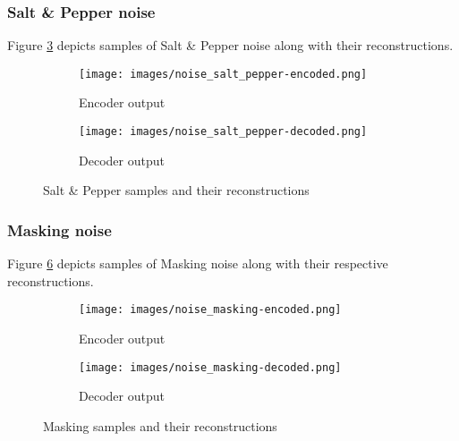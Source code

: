 \documentclass[10pt, a4paper]{article}
\begin{document}
    \subsubsection{Salt \& Pepper noise}
    Figure \ref{fig:figsp} depicts samples of Salt \& Pepper noise along with their reconstructions.
    
    \begin{figure}[h]
    \begin{subfigure}{0.2\textwidth}
    \texttt{[image: images/noise\_salt\_pepper-encoded.png]} 
    \caption{Encoder output}
    \label{fig:subim1}
    \end{subfigure}
    \begin{subfigure}{0.2\textwidth}
    \texttt{[image: images/noise\_salt\_pepper-decoded.png]}
    \caption{Decoder output}
    \label{fig:subim2}
    \end{subfigure}
    \caption{Salt \& Pepper samples and their reconstructions}
    \label{fig:figsp}
    \end{figure}
    
    \subsubsection{Masking noise}
    Figure \ref{fig:figma} depicts samples of Masking noise along with their respective reconstructions.
    
    \begin{figure}[h]
    \begin{subfigure}{0.2\textwidth}
    \texttt{[image: images/noise\_masking-encoded.png]} 
    \caption{Encoder output}
    \label{fig:subim1}
    \end{subfigure}
    \begin{subfigure}{0.2\textwidth}
    \texttt{[image: images/noise\_masking-decoded.png]}
    \caption{Decoder output}
    \label{fig:subim2}
    \end{subfigure}
    \caption{Masking samples and their reconstructions}
    \label{fig:figma}
    \end{figure}    
    
\end{document}
